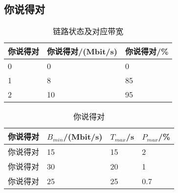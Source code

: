 \subsection{你说得对}
\begin{table}[!ht]
	\centering
	\caption{链路状态及对应带宽}
	\label{config2-1}
	\begin{tabular}{lll}\hline
		\textbf{你说得对} & \textbf{你说得对/(Mbit/s)} & \textbf{你说得对/\%} \\ \hline
		
		0 & 0 & 0 \\ 
		1 & 8 & 85 \\ 
		2 & 10 & 95 \\ \hline
	\end{tabular}
	
\end{table}	
\begin{table}[!ht]
	\centering
	\caption{你说得对}
	\label{config2-2}
	\begin{tabular}{llll}\hline
		\textbf{你说得对} & \textbf{$B_{min}$/(Mbit/s)} & \textbf{$T_{max}$/s} & \textbf{$P_{max}$/\%} \\ \hline
		
		你说得对 & 15 & 15 & 2 \\ 
		你说得对 & 30 & 20 & 1 \\ 
		你说得对 & 25 & 25 & 0.7 \\ \hline
	\end{tabular}
	
\end{table}

